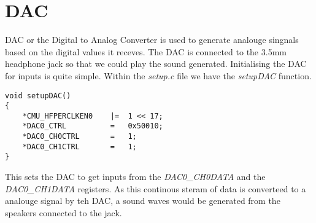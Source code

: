 \section{DAC}
DAC or the Digital to Analog Converter is used to generate analouge singnals based on the digital values it receves.
The DAC is connected to the 3.5mm headphone jack so that we could play the sound generated.
Initialising the DAC for inputs is quite simple.
Within the \emph{setup.c} file we have the \emph{setupDAC} function.

\begin{verbatim}
void setupDAC()
{
    *CMU_HFPERCLKEN0    |=  1 << 17;
    *DAC0_CTRL          =   0x50010;
    *DAC0_CH0CTRL       =   1;
    *DAC0_CH1CTRL       =   1;
}
\end{verbatim}

This sets the DAC to get inputs from the \emph{DAC0_CH0DATA} and the \emph{DAC0_CH1DATA} registers.
As this continous steram of data is converteed to a analouge signal by teh DAC, a sound waves would be generated from the speakers connected to the jack.
